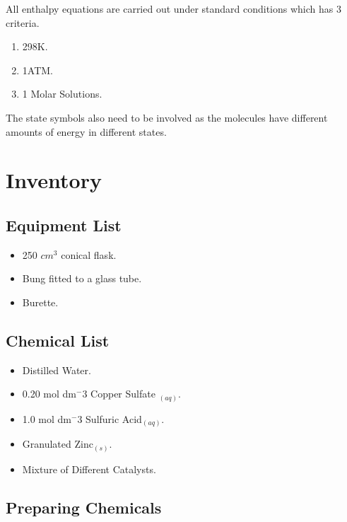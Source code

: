 All enthalpy equations are carried out under standard conditions which has 3 criteria.

\begin{enumerate}
\item 298K.
\item 1ATM.
\item 1 Molar Solutions.
\end{enumerate}

The state symbols also need to be involved as the molecules have different amounts of energy in different states.



\section{Inventory}

	\subsection{Equipment List}
\begin{itemize}
\item 250 $cm^3$ conical flask.
\item Bung fitted to a glass tube.
\item Burette.
\end{itemize}

	\subsection{Chemical List}
\begin{itemize}
\item Distilled Water.
\item 0.20 mol dm$^-3$ Copper Sulfate ${_(aq)}$.
\item 1.0 mol dm$^-3$ Sulfuric Acid${_(aq)}$.
\item Granulated Zinc${_(s)}$.
\item Mixture of Different Catalysts.
\end{itemize}






	\subsection{Preparing Chemicals}









